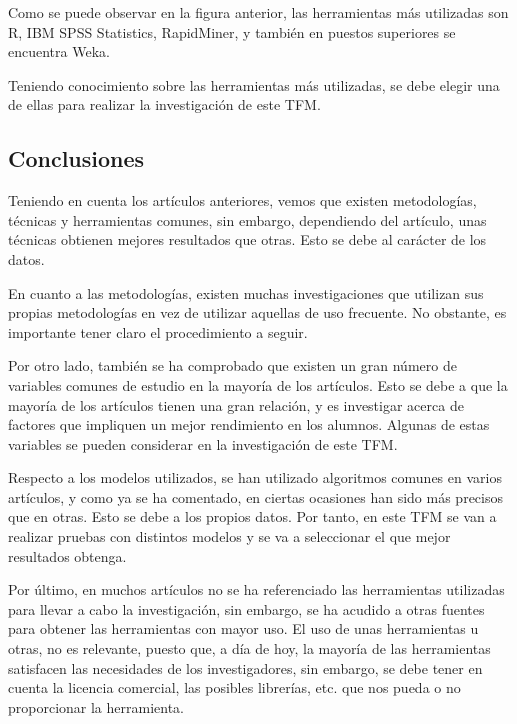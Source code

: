 Como se puede observar en la figura anterior, las herramientas más utilizadas son R, IBM SPSS Statistics, RapidMiner, y también en puestos superiores se encuentra Weka.

Teniendo conocimiento sobre las herramientas más utilizadas, se debe elegir una de ellas para realizar la investigación de este TFM.


\subsection{Conclusiones}

Teniendo en cuenta los artículos anteriores, vemos que existen metodologías, técnicas y herramientas comunes, sin embargo, dependiendo del artículo, unas técnicas obtienen mejores resultados que otras. Esto se debe al carácter de los datos. 

En cuanto a las metodologías, existen muchas investigaciones que utilizan sus propias metodologías en vez de utilizar aquellas de uso frecuente. No obstante, es importante tener claro el procedimiento a seguir.

Por otro lado, también se ha comprobado que existen un gran número de variables comunes de estudio en la mayoría de los artículos. Esto se debe a que la mayoría de los artículos tienen una gran relación, y es investigar acerca de factores que impliquen un mejor rendimiento en los alumnos. Algunas de estas variables se pueden considerar en la investigación de este TFM.

Respecto a los modelos utilizados, se han utilizado algoritmos comunes en varios artículos, y como ya se ha comentado, en ciertas ocasiones han sido más precisos que en otras. Esto se debe a los propios datos. Por tanto, en este TFM se van a realizar pruebas con distintos modelos y se va a seleccionar el que mejor resultados obtenga.

Por último, en muchos artículos no se ha referenciado las herramientas utilizadas para llevar a cabo la investigación, sin embargo, se ha acudido a otras fuentes para obtener las herramientas con mayor uso. El uso de unas herramientas u otras, no es relevante, puesto que, a día de hoy, la mayoría de las herramientas satisfacen las necesidades de los investigadores, sin embargo, se debe tener en cuenta la licencia comercial, las posibles librerías, etc. que nos pueda o no proporcionar la herramienta.

